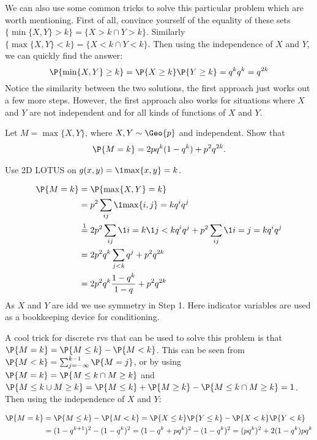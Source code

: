 \begin{exercise}
\begin{solution}
We can also use some common tricks to solve this particular problem which are worth mentioning.
First of all, convince yourself of the equality of these sets $\{\min\{X, Y\} > k\} = \{X > k \cap Y > k\}$.
Similarly $\{\max\{X, Y\} < k\} = \{X < k \cap Y < k\}$.
Then using the independence of $X$ and $Y$, we can quickly find the answer:
\begin{equation*}
\P{\min\{X, Y\} \geq k} = \P{X\geq k}\P{Y\geq k} = q^k q^k = q^{2k}
\end{equation*}
Notice the similarity between the two solutions, the first approach
just works out a few more steps. However, the first approach also
works for situations where $X$ and $Y$ are not independent and for all
kinds of functions of $X$ and $Y$.
\end{solution}
\end{exercise}

\begin{exercise}\label{ex:1}
Let $M=\max\{X, Y\}$, where $X, Y\sim \Geo{p}$ and independent.
Show that
\begin{align*}
\P{M=k} = 2 pq^{k}(1-q^{k}) + p^2q^{2k}.
\end{align*}
\begin{hint}
  Use 2D LOTUS on $g(x,y) = \1{\max\{x, y\} = k}$.
\end{hint}
\begin{solution}
  \begin{align*}
\P{M=k}
&= \P{\max\{X, Y\} = k} \\
&=p^{2}\sum_{ij}\1{\max\{i,j\} =k} q^i q^j\\
&\stackrel{1}{=}2 p^{2}\sum_{ij}\1{i=k}\1{j < k} q^i q^j + p^{2}\sum_{ij}\1{i=j=k} q^{i} q^j \\
&=2 p^{2}q^{k}\sum_{j < k} q^j + p^{2}q^{2k}\\
&=2 p^{2}q^{k}\frac{1-q^{k}}{1-q} +  p^{2}q^{2k}\\
  \end{align*}
As $X$ and $Y$ are idd we use symmetry in Step 1.
Here indicator variables are used as a bookkeeping device for conditioning.

A cool trick for discrete rvs that can be used to solve this problem
is that $\P{M=k} = \P{M \leq k} - \P{M < k}$. This can be seen from
$\P{M < k} = \sum_{j=-\infty}^{k-1} \P{M=j}$, or by using $\P{M=k}
= \P{M\leq k \cap M\geq k}$ and $\P{M\leq k \cup M \geq k} = \P{M\leq
k} + \P{M \geq k} - \P{M\leq k \cap M\geq k} = 1$. Then using the
independence of $X$ and $Y$:

\begin{align*}
\P{M = k} &= \P{M \leq k} - \P{M < k} = \P{X \leq k} \P{Y \leq k} - \P{X < k} \P{Y < k} \\
&= (1-q^{k+1})^2 - (1 - q^k)^2 = (1 - q^k + pq^k)^2 - (1-q^k)^2 = (pq^k)^2 + 2(1-q^k)pq^k
\end{align*}

\end{solution}
\end{exercise}

